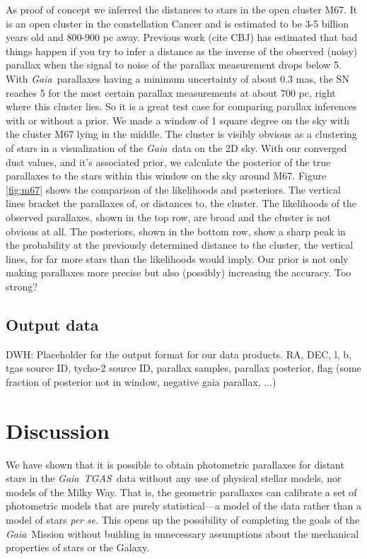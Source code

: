 \documentclass[modern]{aastex61}
\newcommand{\foreign}[1]{\textsl{#1}}
\newcommand{\acronym}[1]{{\small{#1}}}
\newcommand{\project}[1]{\textsl{#1}}
\newcommand{\tgas}{\project{\acronym{TGAS}}}
\newcommand{\gaia}{\project{Gaia}}
\begin{document}
As proof of concept we inferred the distances to stars in the open cluster M67. It is an open cluster in the constellation Cancer and is estimated to be 3-5 billion years old and 800-900 pc away. Previous work (cite CBJ) has estimated that bad things happen if you try to infer a distance as the inverse of the observed (noisy) parallax when the signal to noise of the parallax measurement drops below 5. With \gaia\ parallaxes having a minimum uncertainty of about 0.3 mas, the SN reaches 5 for the most certain parallax measurements at about 700 pc, right where this cluster lies. So it is a great test case for comparing parallax inferences with or without a prior. We made a window of 1 square degree on the sky with the cluster M67 lying in the middle. The cluster is visibly obvious as a clustering of stars in a visualization of the \gaia\ data on the 2D sky. With our converged dust values, and it's associated prior, we calculate the posterior of the true parallaxes to the stars within this window on the sky around M67. Figure \ref{fig:m67} shows the comparison of the likelihoods and posteriors. The vertical lines bracket the parallaxes of, or distances to, the cluster. The likelihoods of the observed parallaxes, shown in the top row, are broad and the cluster is not obvious at all. The posteriors, shown in the bottom row, show a sharp peak in the probability at the previously determined distance to the cluster, the vertical lines, for far more stars than the likelihoods would imply. Our prior is not only making parallaxes more precise but also (possibly) increasing the accuracy. Too strong?


\subsection{Output data}
DWH: Placeholder for the output format for our data products.
RA, DEC, l, b, tgas source ID, tycho-2 source ID, parallax samples, parallax posterior, flag (some fraction of posterior not in window, negative gaia parallax, ...)

\section{Discussion}

We have shown that it is possible to obtain photometric parallaxes for
distant stars in the \gaia\ \tgas\ data without any use of physical stellar
models, nor models of the Milky Way.
That is, the geometric parallaxes can calibrate a set of photometric
models that are purely statistical---a model of the data rather than
a model of stars \foreign{per se}.
This opens up the possibility of completing the goals of the \gaia\ Mission
without building in unnecessary assumptions about the mechanical properties
of stars or the Galaxy.
\end{document}
